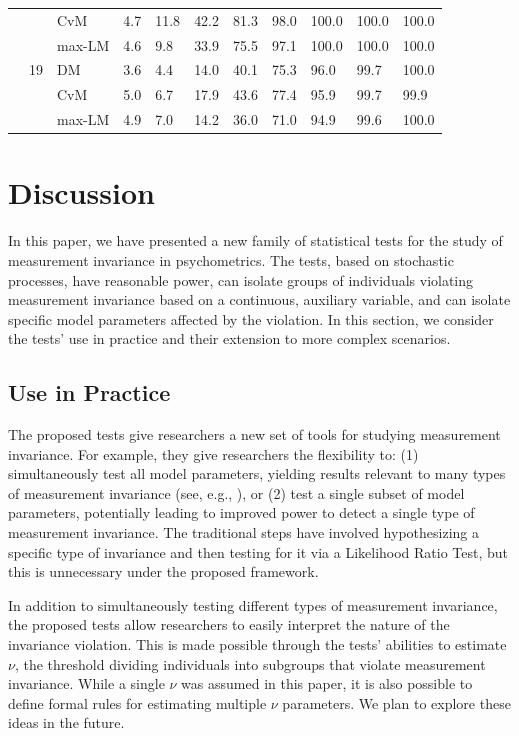 \documentclass[man]{apa}
\begin{document}
\begin{table}
\begin{center}
\begin{tabular}{lllllllllll}
         &         &  CvM            &  4.7 &   11.8 &   42.2 &   81.3 &   98.0 &  100.0  & 100.0 &  100.0 \\ 
         &         &  max-LM          &  4.6 &    9.8 &   33.9 &   75.5 &   97.1 &  100.0  & 100.0 &  100.0 \\ 
         &  19   &  DM           &  3.6 &    4.4 &   14.0 &   40.1 &   75.3 &   96.0  &  99.7 &  100.0 \\ 
         &         &  CvM            &  5.0 &    6.7 &   17.9 &   43.6 &   77.4 &   95.9  &  99.7 &   99.9 \\ 
         &         &  max-LM          &  4.9 &    7.0 &   14.2 &   36.0 &   71.0 &   94.9  &  99.6 &  100.0 \\ 
   \hline
\end{tabular}
\end{center}
\end{table}


\section{Discussion}
In this paper, we have presented a new family of statistical tests for
the study of measurement invariance in psychometrics.  The tests,
based on stochastic processes, have reasonable power, can isolate
groups of individuals violating measurement invariance based on a
continuous, auxiliary variable, and can
isolate specific model parameters affected by the violation.  In this
section, we consider the tests' use in practice and their 
extension to more complex scenarios.

\subsection{Use in Practice}
The proposed tests give researchers a new set of tools for studying 
measurement invariance.  For example, they give researchers the
flexibility to: (1) simultaneously test all model parameters, yielding
results relevant to many types of measurement
invariance (see, e.g., ), or (2) test a single subset of
model parameters, potentially leading to improved power to detect a
single type of measurement invariance.  The traditional
steps have involved hypothesizing a specific type of invariance and
then testing for it via a Likelihood Ratio Test, but this is
unnecessary under the proposed framework.

In addition to simultaneously testing different types of measurement
invariance, the proposed tests allow researchers to easily interpret
the nature of the invariance violation.  This is made possible through
the tests' abilities to estimate $\nu$, the threshold dividing
individuals into subgroups that violate
measurement invariance.  While a single $\nu$ was assumed in this
paper, it is also possible to define 
formal rules for estimating multiple $\nu$ parameters.  We plan to
explore these ideas in the future.
\end{document}
